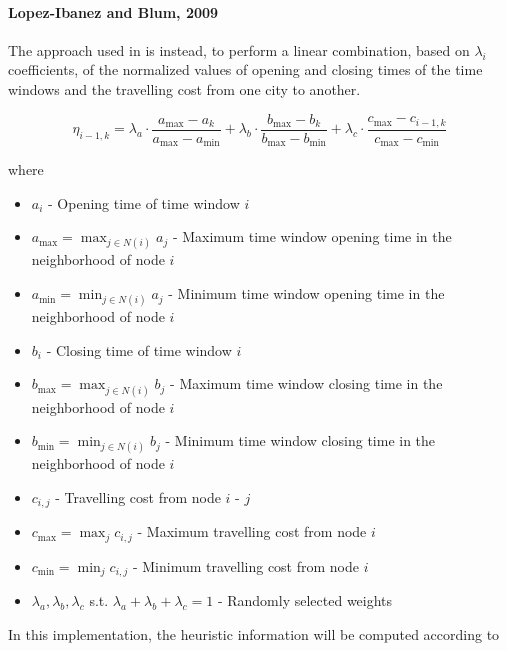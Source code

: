 \begin{homeworkProblem}
\paragraph{Lopez-Ibanez and Blum, 2009}
The approach used in \cite{lopez2010beam} is instead, to perform a linear combination, based on $\lambda_i$ coefficients, of the normalized values of opening and closing times of the time windows and the travelling cost from one city to another.

\begin{equation}
\eta_{i-1,k} = \lambda_{a} \cdot \frac{a_{\max}-a_{k}}{a_{\max}-a_{\min}} + \lambda_{b} \cdot \frac{b_{\max}-b_{k}}{b_{\max}-b_{\min}} + \lambda_{c} \cdot \frac{c_{\max}-c_{i-1,k}}{c_{\max}-c_{\min}}
\end{equation}

where
\begin{itemize}
  \item $a_i$ - Opening time of time window $i$
  \item $a_{\max} = \max_{j \in N(i)} a_{j}$ - Maximum time window opening time in the neighborhood of node $i$
  \item $a_{\min} = \min_{j \in N(i)} a_{j}$ - Minimum time window opening time in the neighborhood of node $i$
  \item $b_i$ - Closing time of time window $i$
  \item $b_{\max} = \max_{j \in N(i)} b_{j}$ - Maximum time window closing time in the neighborhood of node $i$
  \item $b_{\min} = \min_{j \in N(i)} b_{j}$ - Minimum time window closing time in the neighborhood of node $i$
  \item $c_{i,j}$ - Travelling cost from node $i$ - $j$
  \item $c_{\max} = \max_j c_{i,j}$ - Maximum travelling cost from node $i$ 
  \item $c_{\min} = \min_j c_{i,j}$ - Minimum travelling cost from node $i$
  \item $\lambda_{a},\lambda_{b},\lambda_{c}$ s.t. $\lambda_{a}+\lambda_{b}+\lambda_{c}=1$ - Randomly selected weights
\end{itemize}

In this implementation, the heuristic information will be computed according to \cite{lopez2010beam}


\end{homeworkProblem}
